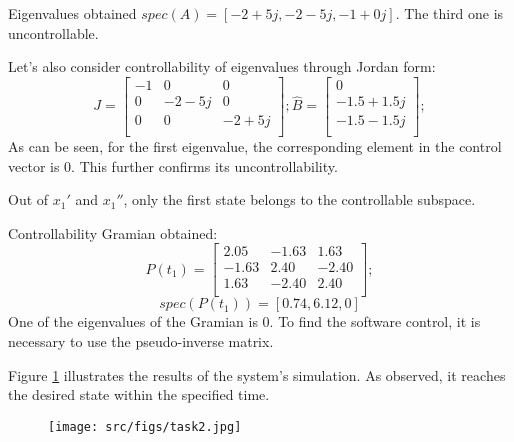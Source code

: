 Eigenvalues obtained \(spec(A) = [-2+5j, -2 -5j, -1+0j]\). The third one is uncontrollable.

Let's also consider controllability of eigenvalues through Jordan form:
\[
        J = \begin{bmatrix}
                -1 & 0 & 0 \\
                0 & -2 - 5j & 0 \\
                0 & 0 & -2 + 5j \\
                \end{bmatrix};
        \hat{B} = \begin{bmatrix}
                0 \\
                -1.5 + 1.5j \\
                -1.5 - 1.5j \\
                \end{bmatrix};
\]
As can be seen, for the first eigenvalue, the corresponding element in the control vector is 0. This further confirms its uncontrollability.

Out of \(x_1'\) and \(x_1''\), only the first state belongs to the controllable subspace.

Controllability Gramian obtained:
\[
        P(t_1) = \begin{bmatrix}
        2.05 & -1.63 & 1.63 \\
        -1.63 & 2.40 & -2.40 \\
        1.63 & -2.40 & 2.40 \\
        \end{bmatrix};
\]
\[
        spec(P(t_1)) = [0.74,  6.12, 0]
\]
One of the eigenvalues of the Gramian is 0. To find the software control, it is necessary to use the pseudo-inverse matrix.

Figure \ref{fig:task2} illustrates the results of the system's simulation. As observed, it reaches the desired state within the specified time.
\begin{figure}[ht!]
        \centering
        \texttt{[image: src/figs/task2.jpg]}
        \label{fig:task2}
\end{figure}
